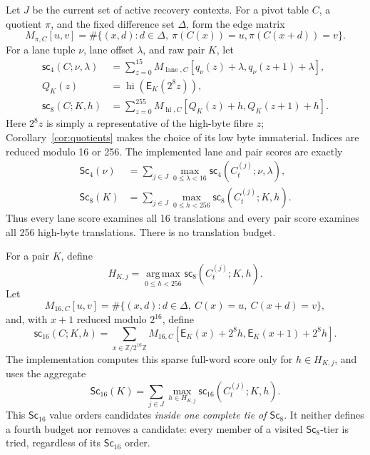 \documentclass[10pt]{article}
\theoremstyle{plain}
\theoremstyle{definition}
\theoremstyle{remark}
\newcommand{\W}{\mathbb Z/2^{16}\mathbb Z}
\newcommand{\E}{\mathsf E}
\newcommand{\hi}{\operatorname{hi}}
\newcommand{\lane}{\operatorname{lane}}
\begin{document}
Let \(J\) be the current set of active recovery contexts.  For a pivot table
\(C\), a quotient \(\pi\), and the fixed difference set \(\Delta\), form the
edge matrix
\begin{equation}
M_{\pi,C}[u,v]=\#\{(x,d):d\in\Delta,\ \pi(C(x))=u,
 \pi(C(x+d))=v\}.
\label{eq:edges}
\end{equation}
For a lane tuple \(\nu\), lane offset \(\lambda\), and raw pair
\(K\), let
\begin{align}
\mathsf{sc}_4(C;\nu,\lambda)
 &=\sum_{z=0}^{15}
 M_{\lane,C}[q_\nu(z)+\lambda,q_\nu(z+1)+\lambda],
 \label{eq:inS4}\\
Q_K(z)&=\hi(\E_K(2^8z)),\nonumber\\
\mathsf{sc}_8(C;K,h)
 &=\sum_{z=0}^{255}
 M_{\hi,C}[Q_K(z)+h,Q_K(z+1)+h].
\label{eq:inS8}
\end{align}
Here \(2^8z\) is simply a representative of the high-byte fibre \(z\);
Corollary~\ref{cor:quotients} makes the choice of its low byte immaterial.
Indices are reduced modulo 16 or 256.  The implemented lane and pair scores
are exactly
\begin{align}
\mathsf{Sc}_4(\nu)&=\sum_{j\in J}\max_{0\leq\lambda<16}
 \mathsf{sc}_4(C_t^{(j)};\nu,\lambda),\label{eq:aggregateS4}\\
\mathsf{Sc}_8(K)&=\sum_{j\in J}\max_{0\leq h<256}
 \mathsf{sc}_8(C_t^{(j)};K,h).\label{eq:aggregateS8}
\end{align}
Thus every lane score examines all 16 translations and every pair score
examines all 256 high-byte translations.  There is no translation budget.

For a pair \(K\), define
\[
H_{K,j}=\operatorname*{arg\,max}_{0\leq h<256}
 \mathsf{sc}_8(C_t^{(j)};K,h).
\]
Let
\[
M_{16,C}[u,v]=\#\{(x,d):d\in\Delta,\ C(x)=u,\ C(x+d)=v\},
\]
and, with \(x+1\) reduced modulo \(2^{16}\), define
\begin{equation}
\mathsf{sc}_{16}(C;K,h)=\sum_{x\in\W}
 M_{16,C}[\E_K(x)+2^8h,\E_K(x+1)+2^8h].
\label{eq:inS16}
\end{equation}
The implementation computes this sparse full-word score only for
\(h\in H_{K,j}\), and uses the aggregate
\begin{equation}
\mathsf{Sc}_{16}(K)=\sum_{j\in J}\max_{h\in H_{K,j}}
\mathsf{sc}_{16}(C_t^{(j)};K,h).
\label{eq:aggregateS16}
\end{equation}
This \(\mathsf{Sc}_{16}\) value orders candidates
\emph{inside one complete tie of \(\mathsf{Sc}_8\)}.  It neither defines a
fourth budget nor removes a candidate: every member of a visited
\(\mathsf{Sc}_8\)-tier is tried, regardless of its \(\mathsf{Sc}_{16}\) order.
\end{document}
